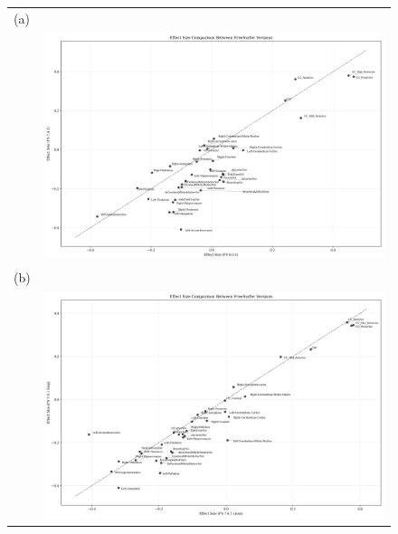 \documentclass[diagnostics,article,accept,pdftex,moreauthors]{Definitions/mdpi}
\begin{document}
\begin{figure}[H]
\begin{tabular}{lc}
\hspace{-10mm} (a) &  \\
\hspace{-35mm} & \includegraphics[width=1.0\textwidth]{figs/effect_sizes_601_vs_741.png}  \\
\hspace{-10mm} (b) &  \\
\hspace{-35mm}  &  \includegraphics[width=1.0\textwidth]{figs/effect_sizes_741_cross_vs_long.png} \\
\end{tabular}



\end{figure}
\end{document}
